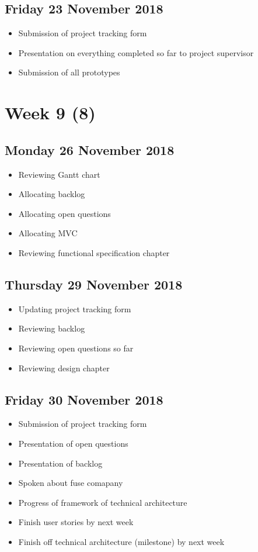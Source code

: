 \subsection*{Friday 23 November 2018}
\begin{itemize}
    \item Submission of project tracking form
	\item Presentation on everything completed so far to project supervisor
	\item Submission of all prototypes
\end{itemize}

\section*{Week 9 (8)}
\subsection*{Monday 26 November 2018}
\begin{itemize}
	\item Reviewing Gantt chart
	\item Allocating backlog
	\item Allocating open questions
	\item Allocating MVC
	\item Reviewing functional specification chapter
\end{itemize}

\subsection*{Thursday 29 November 2018}
\begin{itemize}
	\item Updating project tracking form
	\item Reviewing backlog
	\item Reviewing open questions so far
	\item Reviewing design chapter
\end{itemize}

\subsection*{Friday 30 November 2018}
\begin{itemize}
	\item Submission of project tracking form
	\item Presentation of open questions
	\item Presentation of backlog
	\item Spoken about fuse comapany
	\item Progress of framework of technical architecture
	\item Finish user stories by next week
	\item Finish off technical architecture (milestone) by next week
\end{itemize}

